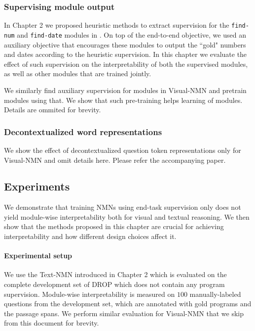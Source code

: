 \documentclass[main.tex]{subfiles}
\begin{document}
\subsubsection{Supervising module output}
In Chapter 2 we proposed heuristic methods to extract supervision for the \texttt{find-num} and \texttt{find-date} modules in \drop{}. On top of the end-to-end objective, we used an auxiliary objective that encourages these modules to output the ``gold" numbers and dates according to the heuristic supervision.
In this chapter we evaluate the effect of such supervision on the interpretability of both the supervised modules, as well as other modules that are trained jointly.

We similarly find auxiliary supervision for modules in Visual-NMN and pretrain modules using that. We show that such pre-training helps learning of modules. Details are ommited for brevity.

\subsubsection{Decontextualized word representations}
We show the effect of decontextualized question token representations only for Visual-NMN and omit details here. Please refer the accompanying paper.


\subsection{Experiments}
We demonstrate that training NMNs using end-task supervision only does not yield module-wise interpretability both for visual and textual reasoning. We then show that the methods proposed in this chapter are crucial for achieving interpretability and how different design choices affect it.

\paragraph{Experimental setup}
We use the Text-NMN introduced in Chapter 2 which is evaluated on the complete development set of DROP which does not contain any program supervision.  Module-wise interpretability is measured on $100$ manually-labeled questions from the development set, which are annotated with gold programs and the passage spans.
We perform similar evaluation for Visual-NMN that we skip from this document for brevity.
\end{document}
